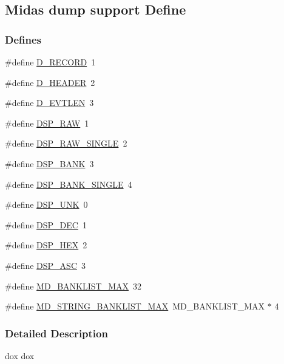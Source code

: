 \subsection{Midas dump support Define}
\label{group__mdsupportdefineh}
\subsubsection*{Defines}
\begin{DoxyCompactItemize}
\item 
\#define \hyperlink{group__mdsupportdefineh_ga3690d638414357c1bd39dd1bcaff5c38}{D\_\-RECORD}~1
\item 
\#define \hyperlink{group__mdsupportdefineh_gafb32f9ec171fac7ce0a9c7b68236e21a}{D\_\-HEADER}~2
\item 
\#define \hyperlink{group__mdsupportdefineh_ga3ca85910f39037dcb031571d75d0fedc}{D\_\-EVTLEN}~3
\item 
\#define \hyperlink{group__mdsupportdefineh_ga91f9ebc9c69f56ea2a32c98fdd3830e4}{DSP\_\-RAW}~1
\item 
\#define \hyperlink{group__mdsupportdefineh_ga6ff7e1a3a24cccf987de9236010fdcac}{DSP\_\-RAW\_\-SINGLE}~2
\item 
\#define \hyperlink{group__mdsupportdefineh_gab226417737baf78d3965f812b2c58b53}{DSP\_\-BANK}~3
\item 
\#define \hyperlink{group__mdsupportdefineh_ga818a76e5aea53754826cdf8753c5e94f}{DSP\_\-BANK\_\-SINGLE}~4
\item 
\#define \hyperlink{group__mdsupportdefineh_ga2a9aaff923e4600138cdbef43951f7c8}{DSP\_\-UNK}~0
\item 
\#define \hyperlink{group__mdsupportdefineh_ga5390ad9ba091ef1e98e36b6f090def3b}{DSP\_\-DEC}~1
\item 
\#define \hyperlink{group__mdsupportdefineh_gab656768737f9e3f933cb2929958f4832}{DSP\_\-HEX}~2
\item 
\#define \hyperlink{group__mdsupportdefineh_gaceb9fcfcef4f3ecba198a88fc503ccca}{DSP\_\-ASC}~3
\item 
\#define \hyperlink{group__mdsupportdefineh_gabe7395f9ad806d1c5695ddce6b7f2bef}{MD\_\-BANKLIST\_\-MAX}~32
\item 
\#define \hyperlink{group__mdsupportdefineh_ga25e499dd284b72f2b514e2f25f03d48b}{MD\_\-STRING\_\-BANKLIST\_\-MAX}~MD\_\-BANKLIST\_\-MAX $\ast$ 4
\end{DoxyCompactItemize}


\subsubsection{Detailed Description}
dox dox 

